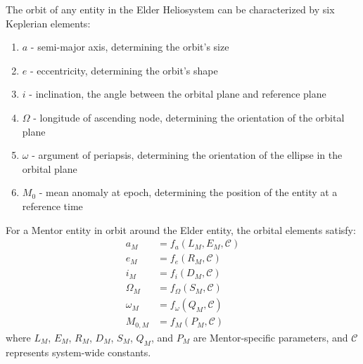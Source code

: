 \begin{definition}
The orbit of any entity in the Elder Heliosystem can be characterized by six Keplerian elements:
\begin{enumerate}
    \item $a$ - semi-major axis, determining the orbit's size
    \item $e$ - eccentricity, determining the orbit's shape
    \item $i$ - inclination, the angle between the orbital plane and reference plane
    \item $\Omega$ - longitude of ascending node, determining the orientation of the orbital plane
    \item $\omega$ - argument of periapsis, determining the orientation of the ellipse in the orbital plane
    \item $M_0$ - mean anomaly at epoch, determining the position of the entity at a reference time
\end{enumerate}
\end{definition}

\begin{theorem}
For a Mentor entity in orbit around the Elder entity, the orbital elements satisfy:
\begin{align}
a_M &= f_a(L_M, E_M, \mathcal{C}) \\
e_M &= f_e(R_M, \mathcal{C}) \\
i_M &= f_i(D_M, \mathcal{C}) \\
\Omega_M &= f_{\Omega}(S_M, \mathcal{C}) \\
\omega_M &= f_{\omega}(Q_M, \mathcal{C}) \\
M_{0,M} &= f_M(P_M, \mathcal{C})
\end{align}
where $L_M$, $E_M$, $R_M$, $D_M$, $S_M$, $Q_M$, and $P_M$ are Mentor-specific parameters, and $\mathcal{C}$ represents system-wide constants.
\end{theorem}

